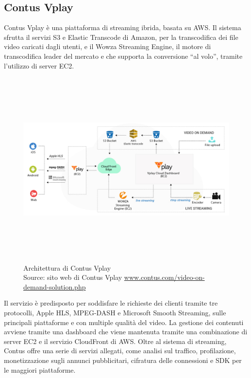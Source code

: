 	\subsection{Contus Vplay}
	Contus Vplay è una piattaforma di streaming ibrida, basata su \gls{AWS}. Il sistema sfrutta il servizi S3 e Elastic Transcode di Amazon, per la transcodifica dei file video caricati dagli utenti, e il Wowza Streaming Engine, il motore di transcodifica leader del mercato e che supporta la conversione ``al volo'', tramite l'utilizzo di server EC2.
	\begin{figure}[H]
		\begin{center}
			\includegraphics[width=16.5cm,height=10cm,keepaspectratio]{immagini/contus-vplay-cloud-architecture.jpg}
			\caption[Architettura di Contus Vplay]{Architettura di Contus Vplay
			\\
			Source: sito web di Contus Vplay \href{http://www.contus.com/video-on-demand-solution.php}{www.contus.com/video-on-demand-solution.php}}
		\end{center}
	\end{figure}
	Il servizio è predisposto per soddisfare le richieste dei clienti tramite tre protocolli, Apple HLS, MPEG-DASH e Microsoft Smooth Streaming, sulle principali piattaforme e con multiple qualità del video. La gestione dei contenuti avviene tramite una dashboard che viene mantenuta tramite una combinazione di server EC2 e il servizio CloudFront di \gls{AWS}. Oltre al sistema di streaming, Contus offre una serie di servizi allegati, come analisi sul traffico, profilazione, monetizzazione sugli annunci pubblicitari, cifratura delle connessioni e SDK per le maggiori piattaforme.

